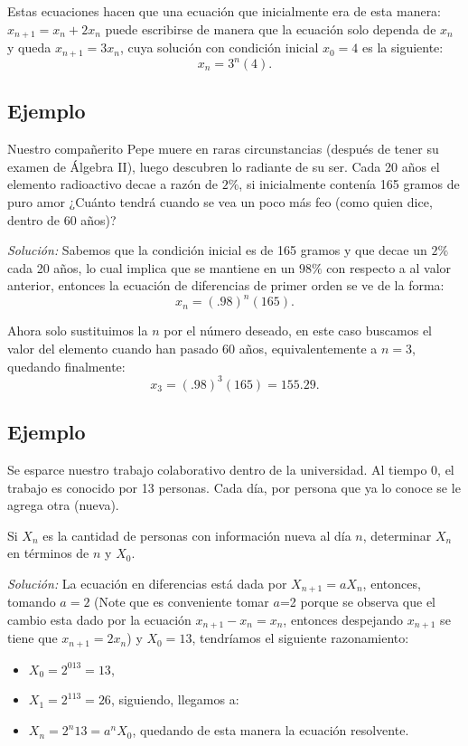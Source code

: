\documentclass{article}
\begin{document}
Estas ecuaciones hacen que una ecuación que inicialmente era de esta
manera: $x_{n+1}=x_n+2x_n$ puede escribirse de manera que la ecuación
solo dependa de $x_n$ y queda $x_{n+1}=3x_n$, cuya solución con
condición inicial $x_0=4$ es la siguiente:
$$x_n=3^n(4).$$

\subsection{Ejemplo}

Nuestro compañerito Pepe muere en raras circunstancias (después de
tener su examen de Álgebra II), luego descubren lo radiante de su
ser. Cada 20 años el elemento radioactivo decae a razón de $2\%$, si
inicialmente contenía 165 gramos de puro amor ¿Cuánto tendrá cuando se
vea un poco más feo (como quien dice, dentro de 60 años)?

\textit{Solución:}  
Sabemos que la condición inicial es de 165 gramos y que decae un $2\%$
cada 20 años, lo cual implica que se mantiene en un $98\%$ con
respecto a al valor anterior, entonces la ecuación de diferencias de
primer orden se ve de la forma:
$$x_{n}=(.98)^n(165).$$

Ahora solo sustituimos la $n$ por el número deseado, en este caso
buscamos el valor del elemento cuando han pasado 60 años,
equivalentemente a $n=3$, quedando finalmente:
$$x_{3}=(.98)^3(165)= 155.29.$$

\subsection{Ejemplo}

Se esparce nuestro trabajo colaborativo dentro de la universidad. Al
tiempo 0, el trabajo es conocido por 13 personas. Cada día, por
persona que ya lo conoce se le agrega otra (nueva).

Si $X_n$ es la cantidad de personas con información nueva al día $n$,
determinar $X_n$ en términos de $n$ y $X_0$.

\textit{Solución:} La ecuación en diferencias está dada por
$X_{n+1}=aX_n$, entonces, tomando $a=2$ (Note que es conveniente tomar
$a$=2 porque se observa que el cambio esta dado por la ecuación
$x_{n+1}-x_{n}=x_{n}$, entonces despejando $x_{n+1}$ se tiene que
$x_{n+1}=2x_n$) y $X_0=13$, tendríamos el siguiente razonamiento:
\begin{itemize}
\item $X_0=2^013=13$,
\item $X_1=2^113=26$, siguiendo, llegamos a:
\item $X_n=2^n13=a^nX_0$, quedando de esta manera la ecuación resolvente.
\end{itemize}
\end{document}
